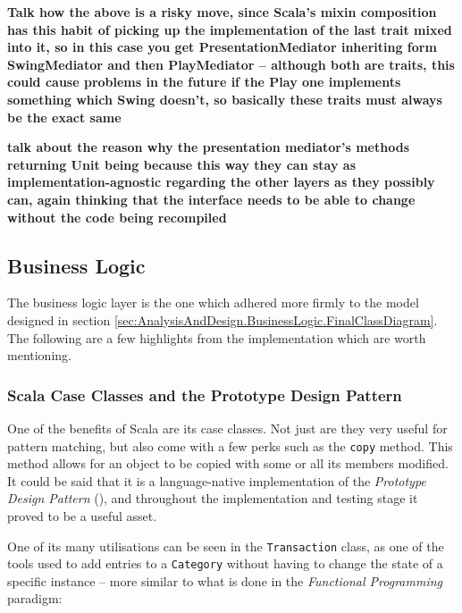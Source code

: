 \textbf{Talk how the above is a risky move, since Scala's mixin composition has
this habit of picking up the implementation of the last trait mixed into it, so
in this case you get PresentationMediator inheriting form SwingMediator and
then PlayMediator -- although both are traits, this could cause problems in the
future if the Play one implements something which Swing doesn't, so basically
these traits must always be the exact same}

\textbf{talk about the reason why the presentation mediator's methods returning
Unit being because this way they can stay as implementation-agnostic regarding
the other layers as they possibly can, again thinking that the interface needs
to be able to change without the code being recompiled}



\subsection{Business Logic} \label{sec:Implementation.BusinessLogic}

The business logic layer is the one which adhered more firmly to the model
designed in section
\ref{sec:AnalysisAndDesign.BusinessLogic.FinalClassDiagram}. The following are
a few highlights from the implementation which are worth mentioning.

\subsubsection{Scala Case Classes and the Prototype Design Pattern} \label{sec:Implementation.ScalaCaseClasses}
One of the benefits of Scala are its case classes. Not just are they very
useful for pattern matching, but also come with a few perks such as the
\texttt{copy} method. This method allows for an object to be copied with some
or all its members modified. It could be said that it is a language-native
implementation of the \emph{Prototype Design Pattern}
(\cite[][Ch.~6,~Location~2461]{nikolov2016scala}), and throughout the
implementation and testing stage it proved to be a useful asset.

One of its many utilisations can be seen in the \texttt{Transaction} class, as
one of the tools used to add entries to a \texttt{Category} without having to
change the state of a specific instance -- more similar to what is done in the
\emph{Functional Programming} paradigm:
{
  \small
  
}


